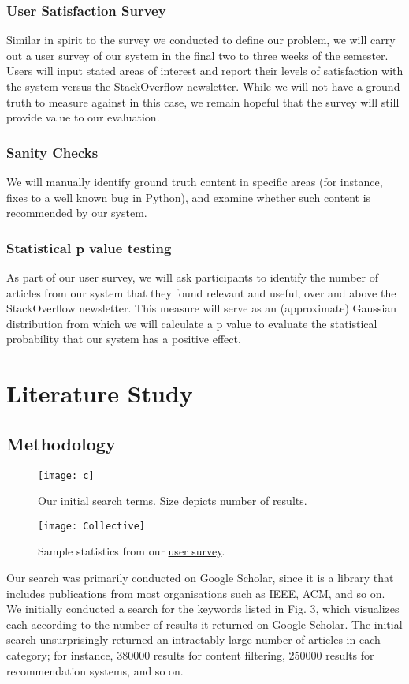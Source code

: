 \documentclass{sig-alternate-05-2015}
\begin{document}
\subsubsection{User Satisfaction Survey}
Similar in spirit to the survey we conducted to define our problem, we will carry out a user survey of our system in the final two to three weeks of the semester. Users will input stated areas of interest and report their levels of satisfaction with the system versus the StackOverflow newsletter. While we will not have a ground truth to measure against in this case, we remain hopeful that the survey will still provide value to our evaluation.

\subsubsection{Sanity Checks}
We will manually identify ground truth content in specific areas (for instance, fixes to a well known bug in Python), and examine whether such content is recommended by our system.

\subsubsection{Statistical p value testing}
As part of our user survey, we will ask participants to identify the number of articles from our system that they found relevant and useful, over and above the StackOverflow newsletter. This measure will serve as an (approximate) Gaussian distribution from which we will calculate a p value to evaluate the statistical probability that our system has a positive effect.
\section{Literature Study}

\subsection{Methodology}
\label{lit}
\begin{figure}
\centering
\texttt{[image: c]}
\caption{Our initial search terms. Size depicts number of results.}
\end{figure}

\begin{figure*}[!h]
\centering
\texttt{[image: Collective]}
\caption{Sample statistics from our \hyperref[sec:hello]{user survey}.}
\end{figure*}
Our search was primarily conducted on Google Scholar, since it is a library that includes publications from most organisations such as IEEE, ACM, and so on. We initially conducted a search for the keywords listed in Fig. 3, which visualizes each according to the number of results it returned on Google Scholar. The initial search unsurprisingly returned an intractably large number of articles in each category; for instance, 380000 results for content filtering, 250000 results for recommendation systems, and so on. 
\end{document}
